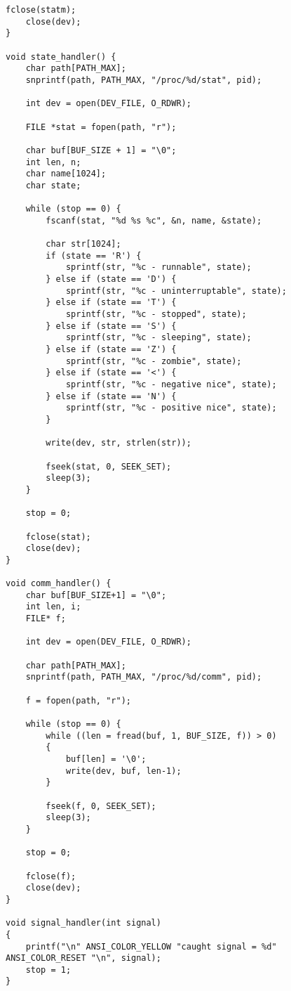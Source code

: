 \begin{appendices}
\begin{lstlisting}[label=client,caption=Код разработанного приложения уровня пользователя]
    fclose(statm);
    close(dev);
}

void state_handler() {
    char path[PATH_MAX];
    snprintf(path, PATH_MAX, "/proc/%d/stat", pid);

    int dev = open(DEV_FILE, O_RDWR);

    FILE *stat = fopen(path, "r");

    char buf[BUF_SIZE + 1] = "\0";
    int len, n;
    char name[1024];
    char state;

    while (stop == 0) {
        fscanf(stat, "%d %s %c", &n, name, &state);

        char str[1024];
        if (state == 'R') {
            sprintf(str, "%c - runnable", state);
        } else if (state == 'D') {
            sprintf(str, "%c - uninterruptable", state);
        } else if (state == 'T') {
            sprintf(str, "%c - stopped", state);
        } else if (state == 'S') {
            sprintf(str, "%c - sleeping", state);
        } else if (state == 'Z') {
            sprintf(str, "%c - zombie", state);
        } else if (state == '<') {
            sprintf(str, "%c - negative nice", state);
        } else if (state == 'N') {
            sprintf(str, "%c - positive nice", state);
        }

        write(dev, str, strlen(str));

        fseek(stat, 0, SEEK_SET);
        sleep(3);
    }

    stop = 0;

    fclose(stat);
    close(dev);
}

void comm_handler() {
    char buf[BUF_SIZE+1] = "\0";
    int len, i;
    FILE* f;

    int dev = open(DEV_FILE, O_RDWR);

    char path[PATH_MAX];
    snprintf(path, PATH_MAX, "/proc/%d/comm", pid);

    f = fopen(path, "r");

    while (stop == 0) {
        while ((len = fread(buf, 1, BUF_SIZE, f)) > 0)
        {
            buf[len] = '\0';
            write(dev, buf, len-1);
        }

        fseek(f, 0, SEEK_SET);
        sleep(3);
    }

    stop = 0;

    fclose(f);
    close(dev);
}

void signal_handler(int signal)
{
    printf("\n" ANSI_COLOR_YELLOW "caught signal = %d" ANSI_COLOR_RESET "\n", signal);
    stop = 1;
}


\end{lstlisting}
\end{appendices}
